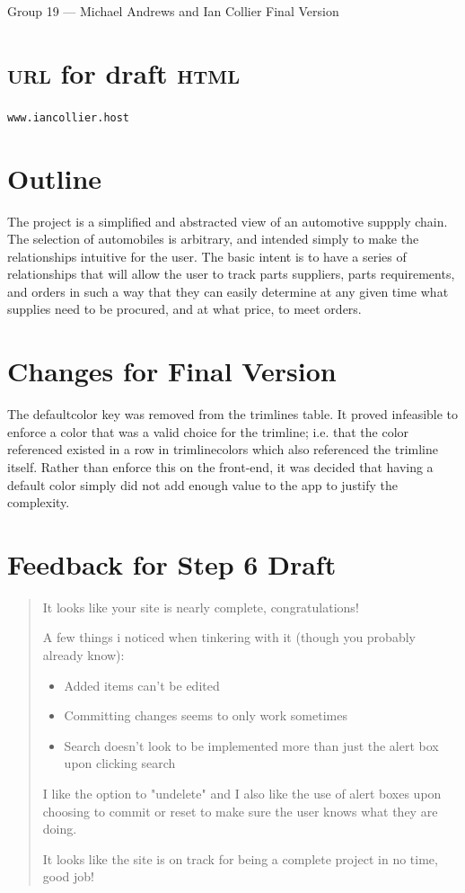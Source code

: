 \documentclass[11pt,letterpaper,oneside]{amsart}
\begin{document}
Group 19 --- Michael Andrews and Ian Collier
Final Version

\section*{\textsc{url} for draft \textsc{html}}

\texttt{www.iancollier.host}

\section*{Outline}


The project is a simplified and abstracted view of an automotive suppply chain.  The selection of automobiles is arbitrary, and intended simply to make the relationships intuitive for the user.  The basic intent is to have a series of relationships that will allow the user to track parts suppliers, parts requirements, and orders in such a way that they can easily determine at any given time what supplies need to be procured, and at what price, to meet orders.

\section*{Changes for Final Version}

The default\textunderscore color key was removed from the trimlines table.  It proved infeasible to enforce a color that was a valid choice for the trimline; i.e. that the color referenced existed in a row in trimline\textunderscore colors which also referenced the trimline itself.  Rather than enforce this on the front-end, it was decided that having a default color simply did not add enough value to the app to justify the complexity.

\section*{Feedback for Step 6 Draft}

\begin{quotation}
It looks like your site is nearly complete, congratulations! 
 
A few things i noticed when tinkering with it (though you probably already know):
 
\begin{itemize}
\item Added items can't be edited

\item Committing changes seems to only work sometimes

\item Search doesn't look to be implemented more than just the alert box upon clicking search

\end{itemize} 

I like the option to "undelete" and I also like the use of alert boxes upon choosing to commit or reset to make sure the user knows what they are doing. 
 

It looks like the site is on track for being a complete project in no time, good job!

\end{quotation}
\end{document}
